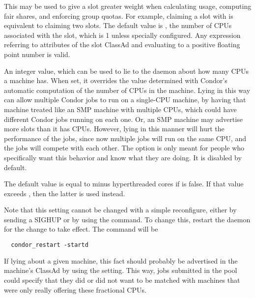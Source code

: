 \begin{description}
\label{param:SlotWeight}
\item[\Macro{SlotWeight}]
  This may be used to give a slot greater weight when
  calculating usage, computing fair shares, and enforcing group
  quotas.  For example, claiming a slot with  is
  equivalent to claiming two  slots.  The default
  value is , the number of CPUs associated with the slot,
  which is 1 unless specially configured.  Any expression referring to
  attributes of the slot ClassAd and evaluating to a positive floating
  point number is valid.

\label{param:NumCpus}
\item[\Macro{NUM\_CPUS}]
  An integer value, which can be used to lie to the  daemon
  about how many CPUs a machine has.
  When set, it overrides the value determined with Condor's 
  automatic computation of the number of CPUs in the machine.
  Lying in this way can allow multiple Condor jobs to run on a
  single-CPU machine, by having that machine treated like an SMP
  machine with multiple CPUs, which could have different Condor jobs
  running on each one.
  Or, an SMP machine may advertise more slots than it has CPUs.
  However, lying in this manner will hurt the performance of the jobs,
  since now multiple jobs will run on the same CPU,
  and the jobs will compete with each other.
  The option is only meant for people who specifically want this
  behavior and know what they are doing.  
  It is disabled by default.

  The default value is equal to  minus
  hyperthreaded cores if  is false.  If
  that value exceeds , then the latter is used
  instead.

  Note that this setting cannot be changed with a simple reconfigure, 
  either by sending a SIGHUP or by using the  command.
  To change this, restart the  daemon for the
  change to take effect. The command will be
\begin{verbatim}
  condor_restart -startd
\end{verbatim}

  If lying about a given machine, 
  this fact should probably be advertised in the machine's ClassAd
  by using the  setting.
  This way, jobs submitted in the pool could specify that they did or
  did not want to be matched with machines that were only really
  offering these fractional CPUs.


\end{description}
